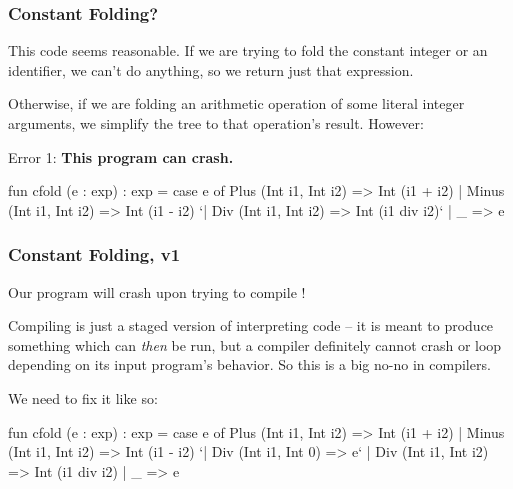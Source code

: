 \documentclass[aspectratio=169]{beamer}
\begin{document}
\begin{frame}[fragile]
  \frametitle{Constant Folding?}

  This code seems reasonable. If we are trying to fold the constant integer
  or an identifier, we can't do anything, so we return just that expression.

  \pause
  \vspace{\fill}

  Otherwise, if we are folding an arithmetic operation of some literal integer
  arguments, we simplify the tree to that operation's result. However:

  \pause
  \vspace{\fill}

  Error 1: \textbf{This program can crash.}

  \pause
  \vspace{\fill}

  {\small
  \begin{codeblock}
    fun cfold (e : exp) : exp =
      case e of
        Plus  (Int i1, Int i2) => Int (i1 + i2)
      | Minus (Int i1, Int i2) => Int (i1 - i2)
      `| Div   (Int i1, Int i2) => Int (i1 div i2)`
      | _ => e
  \end{codeblock}
  }
\end{frame}

\begin{frame}[fragile]
  \frametitle{Constant Folding, v1}

  Our program will crash upon trying to compile !

  \pause
  \vspace{\fill}

  Compiling is just a staged version of interpreting code -- it is meant to
  produce something which can \textit{then} be run, but a compiler definitely
  cannot crash or loop depending on its input program's behavior. So this is
  a big no-no in compilers.

  \pause
  \vspace{\fill}

  We need to fix it like so:

  \pause
  {\small
  \begin{codeblock}
    fun cfold (e : exp) : exp =
      case e of
        Plus  (Int i1, Int i2) => Int (i1 + i2)
      | Minus (Int i1, Int i2) => Int (i1 - i2)
      `| Div   (Int i1, Int 0)  => e`
      | Div   (Int i1, Int i2) => Int (i1 div i2)
      | _ => e
  \end{codeblock}
  }
\end{frame}
\end{document}
